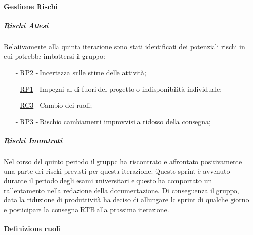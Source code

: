 \documentclass[10pt]{article}
\begin{document}
{{{{{{    \paragraph{Gestione Rischi}\mbox{}
    \vspace{-1em}
    \subparagraph*{Rischi Attesi}\mbox{}
    
    Relativamente alla quinta iterazione sono stati identificati dei potenziali rischi in cui potrebbe imbattersi il gruppo:
    \vspace{-0.5em}
    \begin{itemize}
    \setlength\itemsep{-0.2em}
    \item [-] \hyperref[RP2]{RP2} - Incertezza sulle stime delle attività;
    \item [-] \hyperref[RP1]{RP1} - Impegni al di fuori del progetto o indisponibilità individuale;
    \item [-] \hyperref[RC3]{RC3} - Cambio dei ruoli;
    \item [-] \hyperref[RP3]{RP3} - Rischio cambiamenti improvvisi a ridosso della consegna;
    \end{itemize}

    \subparagraph*{Rischi Incontrati}\mbox{}

    Nel corso del quinto periodo il gruppo ha riscontrato e affrontato positivamente una parte dei rischi previsti per questa iterazione.
    Questo sprint è avvenuto durante il periodo degli esami universitari e questo ha comportato un rallentamento nella redazione della documentazione.
    Di conseguenza il gruppo, data la riduzione di produttività ha deciso di allungare lo sprint di qualche giorno e posticipare la consegna RTB alla prossima iterazione.

    \paragraph{Definizione ruoli}\mbox{}\vspace{0.4em}
    
}}}}}}
\end{document}

